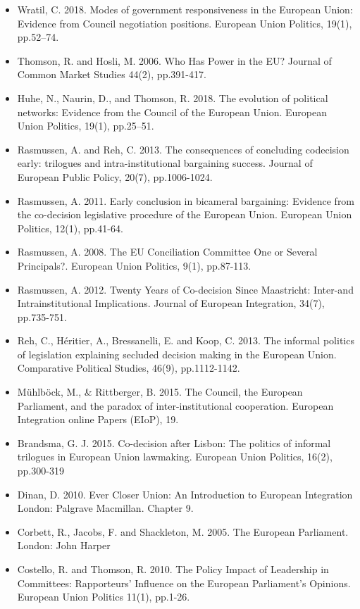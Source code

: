 \begin{itemize}
	\item Wratil, C. 2018. Modes of government responsiveness in the European Union: Evidence from Council negotiation positions. European Union Politics, 19(1), pp.52–74.
	\item Thomson, R. and Hosli, M. 2006. Who Has Power in the EU? Journal of Common Market Studies 44(2), pp.391-417.
	\item Huhe, N., Naurin, D., and Thomson, R. 2018. The evolution of political networks: Evidence from the Council of the European Union. European Union Politics, 19(1), pp.25–51.
	\item Rasmussen, A. and Reh, C. 2013. The consequences of concluding codecision early: trilogues and intra-institutional bargaining success. Journal of European Public Policy, 20(7), pp.1006-1024.
	\item Rasmussen, A. 2011. Early conclusion in bicameral bargaining: Evidence from the co-decision legislative procedure of the European Union. European Union Politics, 12(1), pp.41-64.
	\item Rasmussen, A. 2008. The EU Conciliation Committee One or Several Principals?. European Union Politics, 9(1), pp.87-113.
	\item Rasmussen, A. 2012. Twenty Years of Co-decision Since Maastricht: Inter-and Intrainstitutional Implications. Journal of European Integration, 34(7), pp.735-751.
	\item Reh, C., Héritier, A., Bressanelli, E. and Koop, C. 2013. The informal politics of legislation explaining secluded decision making in the European Union. Comparative Political Studies, 46(9), pp.1112-1142.
	\item M{\"u}hlb{\"o}ck, M., \& Rittberger, B. 2015. The Council, the European Parliament, and the paradox of inter-institutional cooperation. European Integration online Papers (EIoP), 19.
	\item Brandsma, G. J. 2015. Co-decision after Lisbon: The politics of informal trilogues in European Union lawmaking. European Union Politics, 16(2), pp.300-319
	\item Dinan, D. 2010. Ever Closer Union: An Introduction to European Integration London: Palgrave Macmillan. Chapter 9.
	\item Corbett, R., Jacobs, F. and Shackleton, M. 2005. The European Parliament. London: John Harper 
	\item Costello, R. and Thomson, R. 2010. The Policy Impact of Leadership in Committees: Rapporteurs’ Influence on the European Parliament’s Opinions. European Union Politics 11(1), pp.1-26.

\end{itemize}
